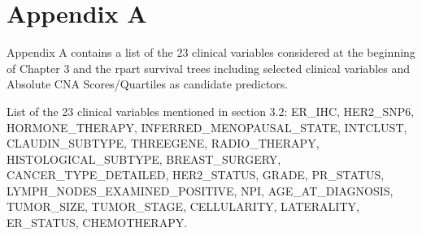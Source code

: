 \renewcommand{\thefigure}{A\arabic{figure}}
\renewcommand{\thetable}{A\arabic{table}}
\setcounter{figure}{0}
\setcounter{table}{0}

\section*{Appendix A}
{}


Appendix A contains a list of the 23 clinical variables considered at the beginning of Chapter 3 and 
the rpart survival trees including selected clinical variables and Absolute CNA Scores/Quartiles as candidate predictors.

List of the 23 clinical variables mentioned in section 3.2: ER\_IHC, HER2\_SNP6, HORMONE\_THERAPY, INFERRED\_MENOPAUSAL\_STATE, INTCLUST, CLAUDIN\_SUBTYPE, THREEGENE, RADIO\_THERAPY, HISTOLOGICAL\_SUBTYPE, BREAST\_SURGERY, CANCER\_TYPE\_DETAILED, HER2\_STATUS, GRADE, PR\_STATUS, LYMPH\_NODES\_EXAMINED\_POSITIVE, NPI, AGE\_AT\_DIAGNOSIS, TUMOR\_SIZE, TUMOR\_STAGE, CELLULARITY, LATERALITY, ER\_STATUS, CHEMOTHERAPY.

